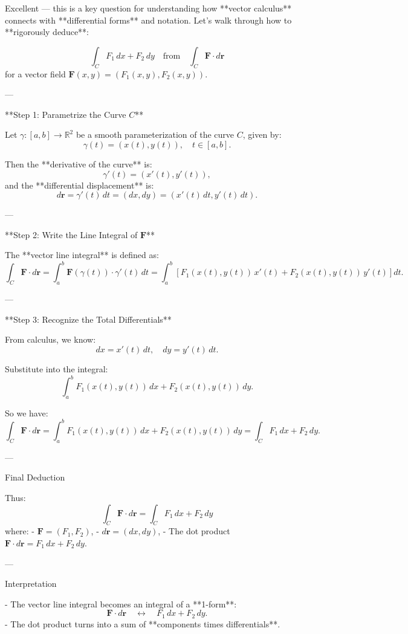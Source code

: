 \documentclass[11pt,openany]{article}
\renewcommand{\vec}[1]{\mathbf{#1}}
\begin{document}
Excellent — this is a key question for understanding how **vector calculus** connects with **differential forms** and notation. Let's walk through how to **rigorously deduce**:

\[
\int_C F_1\,dx + F_2\,dy
\quad \text{from} \quad
\int_C \vec{F} \cdot d\vec{r}
\]
for a vector field \( \vec{F}(x,y) = (F_1(x,y), F_2(x,y)) \).

---



 **Step 1: Parametrize the Curve \( C \)**

Let \( \gamma: [a, b] \to \mathbb{R}^2 \) be a smooth parameterization of the curve \( C \), given by:
\[
\gamma(t) = (x(t), y(t)), \quad t \in [a, b].
\]

Then the **derivative of the curve** is:
\[
\gamma'(t) = (x'(t), y'(t)),
\]
and the **differential displacement** is:
\[
d\vec{r} = \gamma'(t)\,dt = (dx, dy) = (x'(t)\,dt, y'(t)\,dt).
\]

---

 **Step 2: Write the Line Integral of \( \vec{F} \)**

The **vector line integral** is defined as:
\[
\int_C \vec{F} \cdot d\vec{r}
= \int_a^b \vec{F}(\gamma(t)) \cdot \gamma'(t)\,dt
= \int_a^b \left[ F_1(x(t), y(t))\,x'(t) + F_2(x(t), y(t))\,y'(t) \right] dt.
\]

---

 **Step 3: Recognize the Total Differentials**

From calculus, we know:
\[
dx = x'(t)\,dt, \quad dy = y'(t)\,dt.
\]

Substitute into the integral:
\[
\int_a^b F_1(x(t), y(t))\,dx + F_2(x(t), y(t))\,dy.
\]

So we have:
\[
\int_C \vec{F} \cdot d\vec{r}
= \int_a^b F_1(x(t), y(t))\,dx + F_2(x(t), y(t))\,dy
= \int_C F_1\,dx + F_2\,dy.
\]

---

Final Deduction

Thus:
\[
\boxed{
	\int_C \vec{F} \cdot d\vec{r}
	= \int_C F_1\,dx + F_2\,dy
}
\]
where:
- \( \vec{F} = (F_1, F_2) \),
- \( d\vec{r} = (dx, dy) \),
- The dot product \( \vec{F} \cdot d\vec{r} = F_1\,dx + F_2\,dy \).

---

 Interpretation

- The vector line integral becomes an integral of a **1-form**:  
\[
\vec{F} \cdot d\vec{r} \quad \leftrightarrow \quad F_1\,dx + F_2\,dy.
\]
- The dot product turns into a sum of **components times differentials**.
\end{document}
